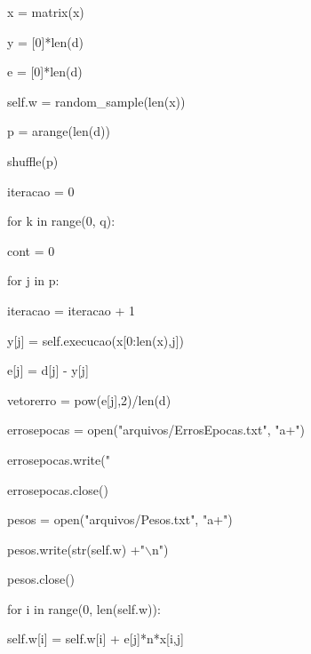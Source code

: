 \documentclass[
12pt, 
a4paper,
oneside,			%
english,			%
french,				%
spanish,			%
brazil,	
]{abntex2}
\begin{document}
\hspace{1,5cm}x = matrix(x)

\hspace{1,5cm}y = [0]*len(d)

\hspace{1,5cm}e = [0]*len(d)

\hspace{1,5cm}self.w = random\_sample(len(x))

\hspace{1,5cm}p = arange(len(d))

\hspace{1,5cm}shuffle(p)

\hspace{1,5cm}iteracao = 0

\hspace{2,0cm}for k in range(0, q):

\hspace{2,5cm}cont = 0

\hspace{2,5cm}for j in p:

\hspace{2,5cm}iteracao = iteracao + 1 

\hspace{2,5cm}y[j] = self.execucao(x[0:len(x),j])

\hspace{2,5cm}e[j] = d[j] - y[j]

\hspace{2,5cm}vetorerro = pow(e[j],2)/len(d)

\hspace{2,5cm}errosepocas = open("arquivos/ErrosEpocas.txt", "a+")

\hspace{2,5cm}errosepocas.write("%

\hspace{2,5cm}errosepocas.close()  

\hspace{2,5cm}pesos = open("arquivos/Pesos.txt", "a+")

\hspace{2,5cm}pesos.write(str(self.w) +"$\backslash$n")

\hspace{2,5cm}pesos.close()

\hspace{2,5cm}for i in range(0, len(self.w)):

\hspace{3,0cm}self.w[i] = self.w[i] + e[j]*n*x[i,j]   
\end{document}
